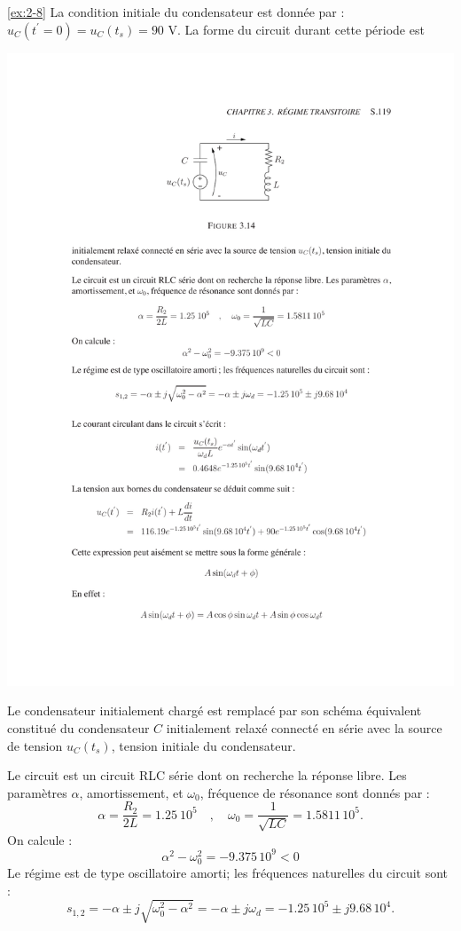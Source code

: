 \begin{solexercise}{\ref{ex:2-8}}
La condition initiale du condensateur est donn\'ee par :
$u_C(t^{'}=0)=u_C(t_s)=90$ V.
La forme du circuit durant cette p\'eriode est 
\begin{center}
	\includegraphics[width=\linewidth]{sol_exercices/ex3-8}
\end{center}
Le condensateur initialement charg\'e est remplac\'e
par son sch\'ema \'equivalent constitu\'e du condensateur $C$ initialement
relax\'e connect\'e en s\'erie avec la source de tension $u_C(t_s)$, tension
initiale du condensateur.


Le circuit est un circuit RLC s\'erie dont on recherche la r\'eponse
libre. Les param\`etres $\alpha$, amortissement, et $\omega_0$, fr\'equence de
r\'esonance sont donn\'es par :
\[\alpha=\frac{R_2}{2L}=1.25\ 10^5\quad , \quad
\omega_0=\frac{1}{\sqrt{LC}}=1.5811\, 10^5.\]
On calcule :
\[\alpha^2-\omega_0^2=-9.375\, 10^9 <0\]
Le r\'egime est de type oscillatoire amorti; les fr\'equences naturelles
du circuit sont :
\[s_{1,2}=-\alpha \pm j\sqrt{\omega_0^2-\alpha^2}=-\alpha \pm j\omega_d=
-1.25\, 10^5 \pm
j9.68\, 10^4.\]


\end{solexercise}
